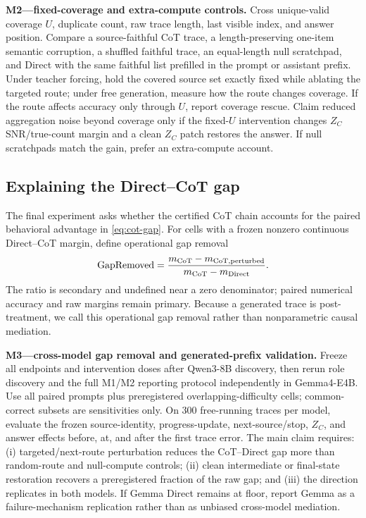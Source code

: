 \begin{todobox}
\textbf{M2---fixed-coverage and extra-compute controls.}
Cross unique-valid coverage \(U\), duplicate count, raw trace length, last visible index, and answer position. Compare a source-faithful CoT trace, a length-preserving one-item semantic corruption, a shuffled faithful trace, an equal-length null scratchpad, and Direct with the same faithful list prefilled in the prompt or assistant prefix. Under teacher forcing, hold the covered source set exactly fixed while ablating the targeted route; under free generation, measure how the route changes coverage. If the route affects accuracy only through \(U\), report coverage rescue. Claim reduced aggregation noise beyond coverage only if the fixed-\(U\) intervention changes \(Z_C\) SNR/true-count margin and a clean \(Z_C\) patch restores the answer. If null scratchpads match the gain, prefer an extra-compute account.
\end{todobox}

\subsection{Explaining the Direct--CoT gap}

The final experiment asks whether the certified CoT chain accounts for the paired behavioral advantage in \cref{eq:cot-gap}. For cells with a frozen nonzero continuous Direct--CoT margin, define operational gap removal
\begin{equation}
\operatorname{GapRemoved}
=
\frac{m_{\rm CoT}-m_{\rm CoT,perturbed}}
{m_{\rm CoT}-m_{\rm Direct}}.
\label{eq:gap-removed}
\end{equation}
The ratio is secondary and undefined near a zero denominator; paired numerical accuracy and raw margins remain primary. Because a generated trace is post-treatment, we call this operational gap removal rather than nonparametric causal mediation.

\begin{todobox}
\textbf{M3---cross-model gap removal and generated-prefix validation.}
Freeze all endpoints and intervention doses after Qwen3-8B discovery, then rerun role discovery and the full M1/M2 reporting protocol independently in Gemma4-E4B. Use all paired prompts plus preregistered overlapping-difficulty cells; common-correct subsets are sensitivities only. On 300 free-running traces per model, evaluate the frozen source-identity, progress-update, next-source/stop, \(Z_C\), and answer effects before, at, and after the first trace error. The main claim requires: (i) targeted/next-route perturbation reduces the CoT--Direct gap more than random-route and null-compute controls; (ii) clean intermediate or final-state restoration recovers a preregistered fraction of the raw gap; and (iii) the direction replicates in both models. If Gemma Direct remains at floor, report Gemma as a failure-mechanism replication rather than as unbiased cross-model mediation.
\end{todobox}

